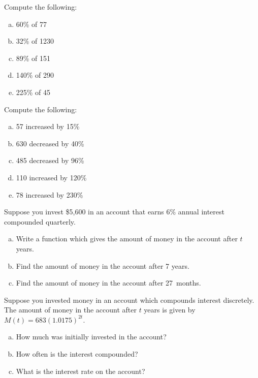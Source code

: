 \documentclass[11pt,letterpaper]{article}
\begin{document}

 Compute the following:
\begin{enumerate}[(a)]
\item 60\% of 77
\item 32\% of 1230
\item 89\% of 151
\item 140\% of 290
\item 225\% of 45
\end{enumerate}



\newpage



 Compute the following:
\begin{enumerate}[(a)]
\item 57 increased by 15\%
\item 630 decreased by 40\%
\item 485 decreased by 96\%
\item 110 increased by 120\%
\item 78 increased by 230\%
\end{enumerate}



\newpage



 Suppose you invest \$5,600 in an account that earns 6\% annual interest compounded quarterly. 
\begin{enumerate}[(a)]
\item Write a function which gives the amount of money in the account after $t$ years.
\item Find the amount of money in the account after 7 years. 
\item Find the amount of money in the account after 27~months. 
\end{enumerate}



\newpage



 Suppose you invested money in an account which compounds interest discretely. The amount of money in the account after $t$ years is given by $M(t)= 683(1.0175)^{2t}$.
\begin{enumerate}[(a)]
\item How much was initially invested in the account?
\item How often is the interest compounded?
\item What is the interest rate on the account?
\end{enumerate}
\end{document}
